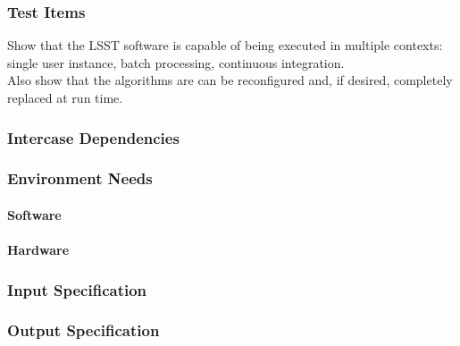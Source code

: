 \subsubsection{Test Items}
Show that the LSST software is capable of being executed in multiple
contexts: single user instance, batch processing, continuous
integration.\\
Also show that the algorithms are can be reconfigured and, if desired,
completely replaced at run time.



\subsubsection{Intercase Dependencies}

\subsubsection{Environment Needs}

\paragraph{Software}

\paragraph{Hardware}

\subsubsection{Input Specification}

\subsubsection{Output Specification}

